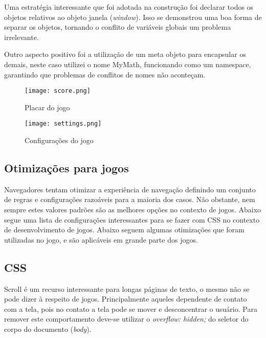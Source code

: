 \begin{draft}
Uma estratégia interessante que foi adotada na construção foi
declarar todos os objetos relativos ao objeto janela (\textit{window}).
Isso se demonstrou uma boa forma de separar os objetos, tornando o
conflito de variáveis globais um problema irrelevante.

Outro aspecto positivo foi a utilização de um meta objeto para
encapsular os demais, neste caso utilizei o nome MyMath, funcionando
como um namespace, garantindo que problemas de conflitos de nomes não
aconteçam.

\begin{figure}
    \centering
    \texttt{[image: score.png]}
	\caption{Placar do jogo}
    \label{fig:placar}
\end{figure}

\begin{figure}
    \centering
    \texttt{[image: settings.png]}
	\caption{Configurações do jogo}
    \label{fig:cofigurations}
\end{figure}

\begin{draft}

\section{Otimizações para jogos}

Navegadores tentam otimizar a experiência de navegação definindo
um conjunto de regras e configurações razoáveis para a maioria dos
casos. Não obstante, nem sempre estes valores padrões são as melhores
opções no contexto de jogos. Abaixo segue uma lista de configurações
interessantes para se fazer com CSS no contexto de desenvolvimento de
jogos.
Abaixo seguem algumas otimizações que foram utilizadas no jogo, e são  aplicáveis 
em grande parte dos jogos.

\subsection{CSS}

Scroll é um recurso interessante para longas páginas de texto,
o mesmo não se pode dizer à respeito de jogos.
Principalmente aqueles dependente de contato com a tela, pois
no contato a tela pode se mover e desconcentrar o usuário. Para
remover este comportamento deve-se utilizar o \textit{overflow:
hidden;} do seletor do corpo do documento (\textit{body}).


\end{draft}
\end{draft}
